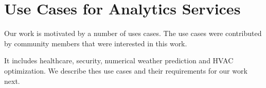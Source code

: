 
\section{Use Cases for Analytics Services}
\label{sec:usecases}

Our work is motivated by a number of uses cases. The use cases were
contributed by community members that were interested in this work.



It includes healthcare, security, numerical weather prediction and
HVAC optimization. We describe thes use cases and their requirements
for our work next.










